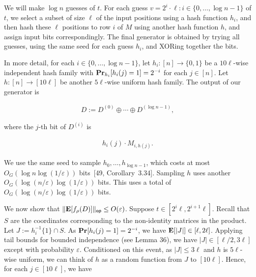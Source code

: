 \documentclass[10pt,a4paper]{article}
\begin{document}
We will make $\log n$ guesses of $t$.
For each guess $v=2^{i}\cdot\ell:i\in\{0,\ldots,\log n-1\}$ of $t$, we select a subset of size $\ell$ of the input positions using a hash function $h_{i}$, and then hash these $\ell$ positions to row $i$ of $M$ using another hash function $h$, and assign input bits correspondingly.
The final generator is obtained by trying all guesses, using the same seed for each guess $h_{i}$, and XORing
together the bits.\par




In more detail, for each $i\in\{0,\ldots,\log n-1\}$, let $h_{i}\colon[n]\to\{0,1\}$ be a $10\ell$-wise independent hash family with $\mathop{\bf Pr\/}_{h_{i}}[h_{i}(j)=1]=2^{-i}$ for each $j\in[n]$.
Let $h\colon[n]\to[10\ell]$ be another $5\ell$-wise uniform hash family.
The output of our generator is\par


\[\begin{gathered}
D:=D^{(0)}\oplus\cdots\oplus D^{(\log n-1)},
\end{gathered}\]


where the $j$-th bit of $D^{(i)}$ is\par


\[\begin{gathered}
h_{i}(j)\cdot M_{i,h(j)}.
\end{gathered}\]


We use the same seed to sample $h_{0},\dots,h_{\log n-1}$, which costs at most $O_{G}(\log n\log(1/\varepsilon))$ bits [49, Corollary 3.34].
Sampling $h$ uses another $O_{G}(\log(n/\varepsilon)\log(1/\varepsilon))$ bits.
This uses a total of $O_{G}(\log(n/\varepsilon)\log(1/\varepsilon))$ bits.\par




We now show that $\lVert\mathop{\bf E\/}[f_{\rho}(D)]\rVert_{\mathsf{op}}\leq O(\varepsilon)$.
Suppose $t\in[2^{i}\ell,2^{i+1}\ell]$.
Recall that $S$ are the coordinates corresponding to the non-identity matrices in the product.
Let $J:=h_{i}^{-1}\{1\}\cap S$.
As $\mathop{\bf Pr\/}[h_{i}(j)=1]=2^{-i}$, we have $\mathop{\bf E\/}[\lvert J\rvert]\in[\ell,2\ell]$.
Applying tail bounds for bounded independence (see Lemma 36), we have $\lvert J\rvert\in[\ell/2,3\ell]$ except with probability $\varepsilon$.
Conditioned on this event, as $\lvert J\rvert\leq 3\ell$ and $h$ is $5\ell$-wise uniform, we can think of $h$ as a random function from $J$ to $[10\ell]$.
Hence, for each $j\in[10\ell]$, we have\par
\end{document}
